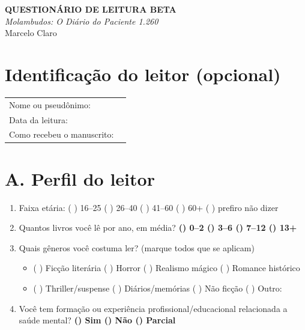 \documentclass[11pt,a4paper]{article}
\newcommand{\resp}[1]{\vspace{2pt}\textbf{#1}\vspace{4pt}}
\begin{document}
\begin{center}
  {\LARGE\bfseries QUESTIONÁRIO DE LEITURA BETA}\\[6pt]
  {\large \emph{Molambudos: O Diário do Paciente 1.260}}\\[4pt]
  Marcelo Claro\par
  \vspace{6pt}
\end{center}

\vspace{10pt}
\section*{Identificação do leitor (opcional)}
\begin{tabular}{@{}p{}p{}@{}}
Nome ou pseudônimo: & \dotfill\\[4pt]
Data da leitura: & \dotfill\\[4pt]
Como recebeu o manuscrito: & \dotfill\\
\end{tabular}

\section*{A. Perfil do leitor}
\begin{enumerate}[label=A\arabic*.]
\item Faixa etária: \quad ( ) 16--25 \quad ( ) 26--40 \quad ( ) 41--60 \quad ( ) 60+ \quad ( ) prefiro não dizer
\item Quantos livros você lê por ano, em média? \hfill \resp{() 0--2 \quad () 3--6 \quad () 7--12 \quad () 13+}
\item Quais gêneros você costuma ler? (marque todos que se aplicam)
  \begin{itemize}[label=\textbullet]
  \item ( ) Ficção literária \quad ( ) Horror \quad ( ) Realismo mágico \quad ( ) Romance histórico
  \item ( ) Thriller/suspense \quad ( ) Diários/memórias \quad ( ) Não ficção \quad ( ) Outro: \dotfill
  \end{itemize}
\item Você tem formação ou experiência profissional/educacional relacionada a saúde mental?
  \hfill \resp{() Sim \quad () Não \quad () Parcial}
\end{enumerate}
\end{document}
